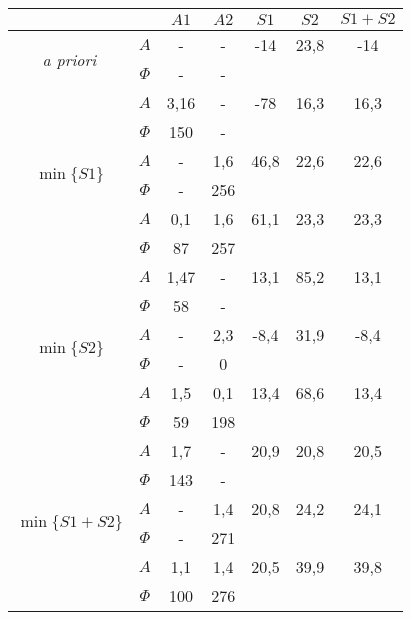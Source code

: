 \documentclass[polish,a4paper,11pt]{mwart}
\begin{document}
  \begin{table}[!tbh]
    \centering
    \begin{tabular}{|c|c|c|c|c|c|c|}
      \cline{3-7}
      \multicolumn{2}{c|}{}&$A1$&$A2$&$S1$&$S2$&$S1+S2$\\\hline
      \multirow{2}{*}{\textit{a priori}} & $A$ & - & - & -14 & 23,8 & -14\\\cline{2-7}
					 & $\Phi$ & - & - & \multicolumn{3}{c}{}\\\hline
      \multirow{6}{*}{$\min\{S1\}$}   &   $A$ & 3,16 & - & -78 & 16,3 & 16,3\\\cline{2-7}
				      &$\Phi$ & 150 & - & \multicolumn{3}{c}{}\\\cline{2-7}
				      &   $A$ & - & 1,6 & 46,8 & 22,6 & 22,6\\\cline{2-7}
				      &$\Phi$ & - & 256 & \multicolumn{3}{c}{}\\\cline{2-7}
				      &   $A$ & 0,1 & 1,6 & 61,1 & 23,3 & 23,3\\\cline{2-7}
				      &$\Phi$ & 87 & 257 & \multicolumn{3}{c}{}\\\hline
      \multirow{6}{*}{$\min\{S2\}$}   &   $A$ & 1,47 & - & 13,1 & 85,2 & 13,1\\\cline{2-7}
				      &$\Phi$ & 58 & - & \multicolumn{3}{c}{}\\\cline{2-7}
				      &   $A$ & - & 2,3 & -8,4 & 31,9 & -8,4\\\cline{2-7}
				      &$\Phi$ & - & 0 & \multicolumn{3}{c}{}\\\cline{2-7}
				      &   $A$ & 1,5 & 0,1 & 13,4 & 68,6 & 13,4\\\cline{2-7}
				      &$\Phi$ & 59 & 198 & \multicolumn{3}{c}{}\\\hline
      \multirow{6}{*}{$\min\{S1+S2\}$}&   $A$ & 1,7 & - & 20,9 & 20,8 & 20,5\\\cline{2-7}
				      &$\Phi$ & 143 & - & \multicolumn{3}{c}{}\\\cline{2-7}
				      &   $A$ & - & 1,4 & 20,8 & 24,2 & 24,1\\\cline{2-7}
				      &$\Phi$ & - & 271 & \multicolumn{3}{c}{}\\\cline{2-7}
				      &   $A$ & 1,1 & 1,4 & 20,5 & 39,9 & 39,8\\\cline{2-7}
				      &$\Phi$ & 100 & 276 & \multicolumn{3}{c}{}\\\cline{1-4}
    \end{tabular}
  \end{table}
\end{document}
